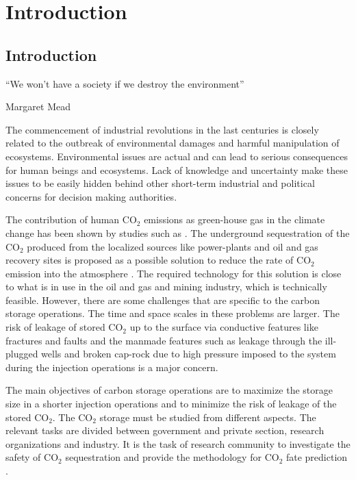 \chapter{Introduction}
%



\pagebreak
\section{Introduction}

``We won’t have a society if we destroy the environment''

Margaret Mead

The commencement of industrial revolutions in the last centuries is closely related to the outbreak of environmental damages and harmful manipulation of ecosystems. Environmental issues are actual and can lead to serious consequences for human beings and ecosystems. Lack of knowledge and uncertainty make these issues to be easily hidden behind other short-term industrial and political concerns for decision making authorities. 
 
The contribution of human $\mbox{CO}_2$ emissions as green-house gas in the climate change has been shown by studies such as \cite{houghton2001climate}. The underground sequestration of the $\mbox{CO}_2$ produced from the localized sources like power-plants and oil and gas recovery sites is proposed as a possible solution to reduce the rate of $\mbox{CO}_2$ emission into the atmosphere \cite{hitchon1999sedimentary,bradshaw2001geological}. The required technology for this solution is close to what is in use in the oil and gas and mining industry, which is technically feasible. However, there are some challenges that are specific to the carbon storage operations. The time and space scales in these problems are larger. The risk of leakage of stored $\mbox{CO}_2$ up to the surface via conductive features like fractures and faults and the manmade features such as leakage through the ill-plugged wells and broken cap-rock due to high pressure imposed to the system during the injection operations is a major concern. 

The main objectives of carbon storage operations are to maximize the storage size in a shorter injection operations and to minimize the risk of leakage of the stored $\mbox{CO}_2$. The $\mbox{CO}_2$ storage must be studied from different aspects. The relevant tasks are divided between government and private section, research organizations and industry. It is the task of research community to investigate the safety of $\mbox{CO}_2$ sequestration and provide the methodology for $\mbox{CO}_2$ fate prediction \cite{bachu2000sequestration}.

